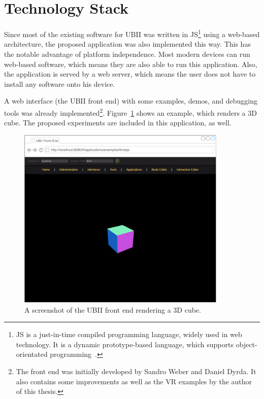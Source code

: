 \section{Technology Stack}\label{section:technology-stack}

Since most of the existing software for \gls{UBII} was written in \acrfull{JS}\footnote{\gls{JS} is a just-in-time compiled programming language, widely used in web technology. It is a dynamic prototype-based language, which supports object-orientated programming~\cite[43, 47]{ECMAInternational.2018}.} using a web-based architecture, the proposed application was also implemented this way. This has the notable advantage of platform independence. Most modern devices can run web-based software, which means they are also able to run this application. Also, the application is served by a web server, which means the user does not have to install any software onto his device.

A web interface (the \gls{UBII} front end) with some examples, demos, and debugging tools was already implemented\footnote{The front end was initially developed by Sandro Weber and Daniel Dyrda. It also contains some improvements as well as the \gls{VR} examples by the author of this thesis.}. Figure~\ref{fig:ubii-front-end} shows an example, which renders a \gls{3D} cube. The proposed experiments are included in this application, as well.

\begin{figure}[H]
	\centering
	\includegraphics[width=10cm]{figures/implementation/ubii_front_end.pdf}
	\caption[Screenshot of the front end]{A screenshot of the UBII front end rendering a \gls{3D} cube.}\label{fig:ubii-front-end}
\end{figure}

